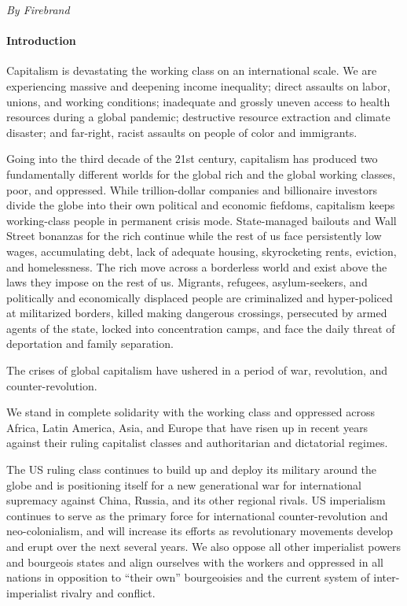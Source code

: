 \emph{By Firebrand}

\paragraph{Introduction}

Capitalism is devastating the working class on an international scale. We are experiencing massive and deepening income inequality; direct assaults on labor, unions, and working conditions; inadequate and grossly uneven access to health resources during a global pandemic; destructive resource extraction and climate disaster; and far-right, racist assaults on people of color and immigrants.

Going into the third decade of the 21st century, capitalism has produced two fundamentally different worlds for the global rich and the global working classes, poor, and oppressed. While trillion-dollar companies and billionaire investors divide the globe into their own political and economic fiefdoms, capitalism keeps working-class people in permanent crisis mode. State-managed bailouts and Wall Street bonanzas for the rich continue while the rest of us face persistently low wages, accumulating debt, lack of adequate housing, skyrocketing rents, eviction, and homelessness. The rich move across a borderless world and exist above the laws they impose on the rest of us. Migrants, refugees, asylum-seekers, and politically and economically displaced people are criminalized and hyper-policed at militarized borders, killed making dangerous crossings, persecuted by armed agents of the state, locked into concentration camps, and face the daily threat of deportation and family separation.

The crises of global capitalism have ushered in a period of war, revolution, and counter-revolution.

We stand in complete solidarity with the working class and oppressed across Africa, Latin America, Asia, and Europe that have risen up in recent years against their ruling capitalist classes and authoritarian and dictatorial regimes.

The US ruling class continues to build up and deploy its military around the globe and is positioning itself for a new generational war for international supremacy against China, Russia, and its other regional rivals. US imperialism continues to serve as the primary force for international counter-revolution and neo-colonialism, and will increase its efforts as revolutionary movements develop and erupt over the next several years. We also oppose all other imperialist powers and bourgeois states and align ourselves with the workers and oppressed in all nations in opposition to ``their own'' bourgeoisies and the current system of inter-imperialist rivalry and conflict.

